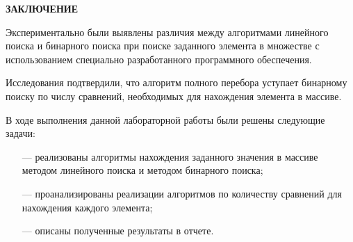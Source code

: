 \begin{center}
    \textbf{ЗАКЛЮЧЕНИЕ}
\end{center}

Экспериментально были выявлены различия между алгоритмами линейного поиска и бинарного поиска при поиске заданного элемента в множестве с использованием специально разработанного программного обеспечения.

Исследования подтвердили, что алгоритм полного перебора уступает бинарному поиску по числу сравнений, необходимых для нахождения элемента в массиве.

\vspace{5mm}

В ходе выполнения данной лабораторной работы были решены следующие задачи:
\begin{itemize}
    \item[---] реализованы алгоритмы нахождения заданного значения в массиве методом линейного поиска и методом бинарного поиска;
    \item[---] проанализированы реализации алгоритмов по количеству сравнений для нахождения каждого элемента;
    \item[---] описаны полученные результаты в отчете.
\end{itemize}